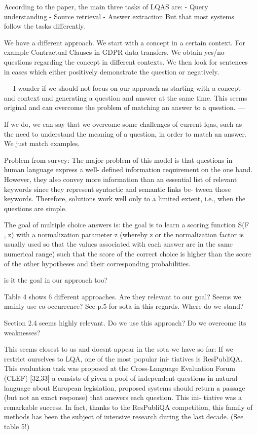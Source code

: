 \documentclass{IOS-Book-Article}
\begin{document}
According to the paper, the main three tasks of LQAS are:
- Query understanding
- Source retrieval
- Answer extraction
But that most systems follow the tasks differently.

We have a different approach. We start with a concept in a certain context. For example Contractual Clauses in GDPR data transfers. We obtain yes/no questions regarding the concept in different contexts. We then look for sentences in cases which either positively demonstrate the question or negatively.

---
I wonder if we should not focus on our approach as starting with a concept and context and generating a question and answer at the same time. This seems original and can overcome the problem of matching an answer to a question.
---

If we do, we can say that we overcome some challenges of current lqas, such as the need to understand the meaning of a question, in order to match an answer. We just match examples.

Problem from survey: The major problem of
this model is that questions in human language express a well-
defined information requirement on the one hand. However, they
also convey more information than an essential list of relevant
keywords since they represent syntactic and semantic links be-
tween those keywords. Therefore, solutions work well only to a
limited extent, i.e., when the questions are simple.

The goal of multiple choice answers is: the goal is to learn a scoring function S(F , z) with a
normalization parameter z (whereby z or the normalization factor
is usually used so that the values associated with each answer are
in the same numerical range) such that the score of the correct
choice is higher than the score of the other hypotheses and their
corresponding probabilities.

is it the goal in our approach too?

Table 4 shows 6 different approaches. Are they relevant to our goal? Seems we mainly use co-occurrence? See p.5 for sota in this regards. Where do we stand?

Section 2.4 seems highly relevant. Do we use this approach? Do we overcome its weaknesses?

This seems closest to us and doesnt appear in the sota we have so far: If we restrict ourselves to LQA, one of the most popular ini-
tiatives is ResPubliQA. This evaluation task was proposed at the
Cross-Language Evaluation Forum (CLEF) [32,33] a consists of
given a pool of independent questions in natural language about
European legislation, proposed systems should return a passage
(but not an exact response) that answers each question. This ini-
tiative was a remarkable success. In fact, thanks to the ResPubliQA
competition, this family of methods has been the subject of
intensive research during the last decade. (See table 5!)
\end{document}
